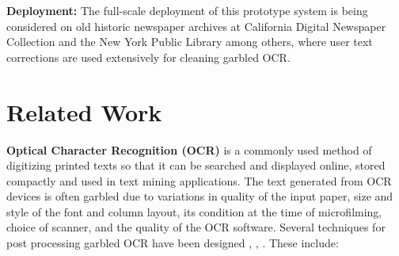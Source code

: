 \documentclass{sig-alternate}
\begin{document}


\noindent \textbf{Deployment: }The full-scale deployment of this prototype system is being considered on old historic newspaper archives at California Digital Newspaper Collection and the New York Public Library among others, where  user text corrections are used extensively for cleaning garbled OCR. 

\section{Related Work}
\label{sec:related}
\noindent \textbf{Optical Character Recognition (OCR)} is a commonly used method of digitizing printed texts so that it can be searched and displayed online, stored compactly and used in text mining applications. The text generated from OCR devices is often garbled due to variations in quality of the input paper, size and style of the font and column layout, its condition at the time of microfilming, choice of scanner, and the quality of the OCR software. Several techniques for post processing garbled OCR have been designed \cite{Fujisawa_08}, \cite{Esakov_94}, \cite{Lecun_90}. These include:
\end{document}
